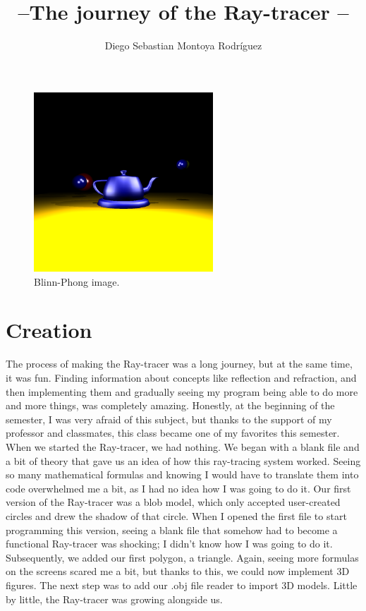 \documentclass[12pt]{article}
\title{ --The journey of the Ray-tracer -- }
\author{Diego Sebastian Montoya Rodríguez}
\begin{document}
	
	\maketitle
	\vspace{10pt} %
	
	\begin{figure}[h]
		\centering
		\includegraphics[width=0.6\textwidth]{image7.png}
		\caption{Blinn-Phong image.}
		\label{fig:ejemplo}
		
	\end{figure}
	\pagebreak
	\section{Creation}
	
	The process of making the Ray-tracer was a long journey, but at the same time, it was fun. Finding information about concepts like reflection and refraction, and then implementing them and gradually seeing my program being able to do more and more things, was completely amazing. Honestly, at the beginning of the semester, I was very afraid of this subject, but thanks to the support of my professor and classmates, this class became one of my favorites this semester.\\
	
	When we started the Ray-tracer, we had nothing. We began with a blank file and a bit of theory that gave us an idea of how this ray-tracing system worked. Seeing so many mathematical formulas and knowing I would have to translate them into code overwhelmed me a bit, as I had no idea how I was going to do it. Our first version of the Ray-tracer was a blob model, which only accepted user-created circles and drew the shadow of that circle. When I opened the first file to start programming this version, seeing a blank file that somehow had to become a functional Ray-tracer was shocking; I didn’t know how I was going to do it. Subsequently, we added our first polygon, a triangle. Again, seeing more formulas on the screens scared me a bit, but thanks to this, we could now implement 3D figures. The next step was to add our .obj file reader to import 3D models. Little by little, the Ray-tracer was growing alongside us.\\
	
\end{document}
